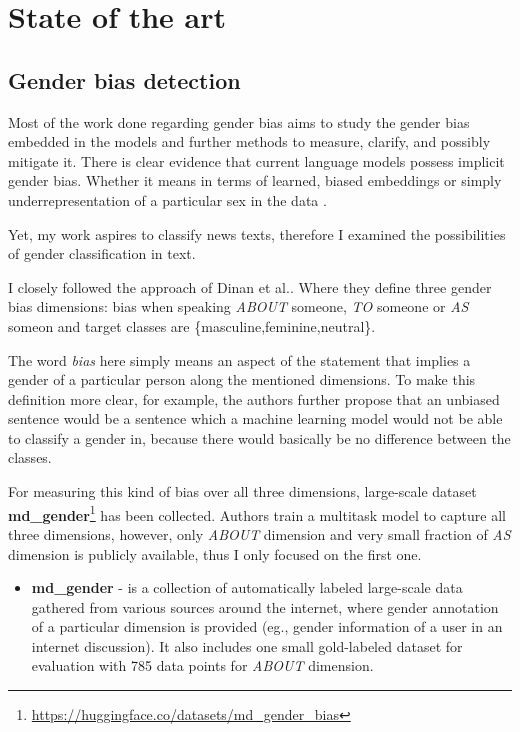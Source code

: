 \chapter{State of the art}

\section{Gender bias detection}
Most of the work done regarding gender bias aims to study the gender bias embedded in the models and further methods to measure, clarify, and possibly mitigate it.
There is clear evidence that current language models possess implicit gender bias. Whether it means in terms of learned, biased embeddings \cite{bolukbasi2016man} or simply underrepresentation of a particular sex in the data \cite{sun-peng-2021-men}. 

Yet, my work aspires to classify news texts, therefore I examined the possibilities of gender classification in text.

I closely followed the approach of Dinan et al.\cite{dinan2020multi}. Where they define three gender bias dimensions: bias when speaking \textit{ABOUT} someone, \textit{TO} someone or \textit{AS} someon and target classes are \{masculine,feminine,neutral\}. 

The word \textit{bias} here simply means an aspect of the statement that implies a gender of a particular person along the mentioned dimensions. To make this definition more clear, for example, the authors further propose that an unbiased sentence would be a sentence which a machine learning model would not be able to classify a gender in, because there would basically be no difference between the classes.

For measuring this kind of bias over all three dimensions, large-scale dataset \textbf{md\_gender}\footnote{\url{https://huggingface.co/datasets/md_gender_bias}} has been collected. Authors train a multitask model to capture all three dimensions, however, only \textit{ABOUT} dimension and very small fraction of \textit{AS} dimension is publicly available, thus I only focused on the first one.

\begin{itemize}
\item \textbf{md\_gender} - is a collection of automatically labeled large-scale data gathered from various sources around the internet, where gender annotation of a particular dimension is provided (eg., gender information of a user in an internet discussion). It also includes one small gold-labeled dataset for evaluation with 785 data points for \textit{ABOUT} dimension.
\end{itemize}

